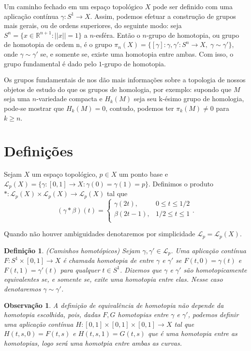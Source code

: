 \documentclass[12pt]{book}
\newtheorem{definicao}[teorema]{Definição}
\newtheorem{observacao}[teorema]{Observação}
\newcommand{\caminhospontobase}[1]{\mathcal{L}_{#1}}
\newcommand{\caminhospontobasegeral}[2]{\mathcal{L}_{#1}(#2)}
\newcommand{\circulo}{S^{1}}
\newcommand{\classe}[1]{[#1]}
\newcommand{\funcaocond}[5]{
	#1 = 
	\left\{
	\begin{array}{cc}
		#2, & #3\\
		#4, & #5\\
	\end{array}
	\right.
}
\newcommand{\homologia}[2]{H_{#1}(#2)}
\newcommand{\norma}[1]{||#1||}
\newcommand{\real}[1]{\mathbb{R}^{#1}}
\begin{document}
	Um caminho fechado em um espaço topológico $X$ pode ser definido com uma aplicação contínua $\gamma:\circulo\to X$. Assim, podemos efetuar a construção de grupos mais gerais, ou de ordens superiores, do seguinte modo: seja $S^{n}= \{x \in \real{n+1}: \norma{x}=1\}$ a $n$-esféra. Então o $n$-grupo de homotopia, ou grupo de homotopia de ordem n, é o grupo $\pi_{n}(X) = \{\classe{\gamma}: \gamma,\gamma':S^{n}\to X,\; \gamma \sim \gamma'\}$, onde $\gamma \sim \gamma'$ se, e somente se, existe uma homotopia entre ambas. Com isso, o grupo fundamental é dado pelo $1$-grupo de homotopia.
	
	Os grupos fundamentais de nos dão mais informações sobre a topologia de nossos objetos de estudo do que os grupos de homologia, por exemplo: supondo que $M$ seja uma $n$-variedade compacta e $H_{k}(M)$ seja seu k-ésimo grupo de homologia, pode-se mostrar que $\homologia{k}{M} = 0$, contudo, podemos ter $\pi_{k}(M)\neq 0$ para $k\geq n$.
	
	\section{Definições}
	
	Sejam $X$ um espaço topológico, $p \in X$ um ponto base e $\caminhospontobasegeral{p}{X}=\{\gamma:[0,1]\to X: \gamma(0) = \gamma(1) = p\}$. Definimos o produto $*:\caminhospontobasegeral{p}{X}\times \caminhospontobasegeral{p}{X} \to \caminhospontobasegeral{p}{X}$ tal que
	$$
		\funcaocond{(\gamma*\beta)(t)}{\gamma(2t)}{0\leq t \leq 1/2}{\beta(2t-1)}{1/2 \leq t \leq 1}.
	$$
	
	Quando não houver ambiguidades denotaremos por simplicidade $\caminhospontobase{p}=\caminhospontobasegeral{p}{X}$.
	
	\begin{definicao}\label{definicao_caminhos_homotopicos}
		(Caminhos homotópicos) Sejam $\gamma, \gamma' \in \caminhospontobase{p}$. Uma aplicação contínua $F:\circulo \times [0,1] \to X$ é chamada homotopia de entre $\gamma$ e $\gamma'$ se $F(t, 0) = \gamma(t)$ e $F(t, 1) = \gamma'(t)$ para qualquer $t\in \circulo$. Dizemos que  $\gamma$ e $\gamma'$ são homotopicamente equivalentes se, e somente se, exite uma homotopia entre elas. Nesse caso denotaremos $\gamma \sim \gamma'$. 
	\end{definicao}
	
	\begin{observacao}
		A definição de equivalência de homotopia não depende da homotopia escolhida, pois, dadas $F,G$ homotopias entre $\gamma$ e $\gamma'$, podemos definir uma aplicação contínua $H: [0,1] \times [0,1] \times [0,1] \to X$ tal que $H(t,s ,0) = F(t,s)$ e $H(t,s, 1) = G(t,s)$ que é uma homotopia entre as homotopias, logo será uma homotpia entre ambas as curvas.
	\end{observacao}
	
\end{document}
